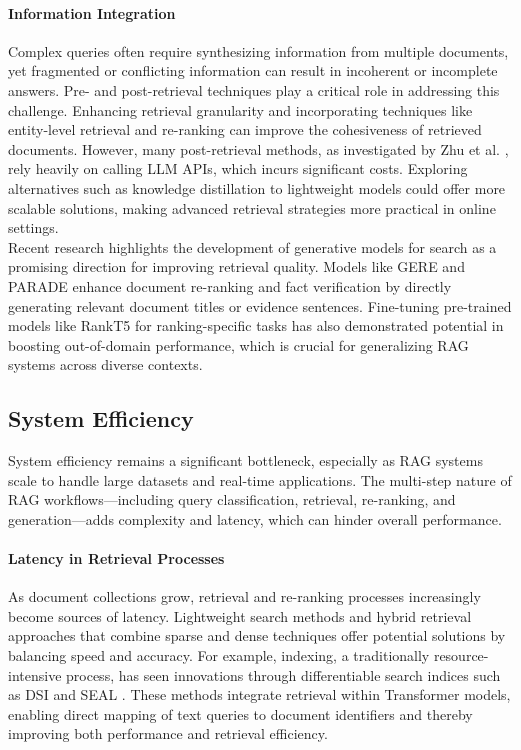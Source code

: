 \paragraph{Information Integration}
Complex queries often require synthesizing information from multiple documents, yet fragmented or conflicting information can result in incoherent or incomplete answers. Pre- and post-retrieval techniques play a critical role in addressing this challenge. Enhancing retrieval granularity and incorporating techniques like entity-level retrieval and re-ranking can improve the cohesiveness of retrieved documents. However, many post-retrieval methods, as investigated by Zhu et al. \cite{zhu2023large}, rely heavily on calling LLM APIs, which incurs significant costs. Exploring alternatives such as knowledge distillation to lightweight models could offer more scalable solutions, making advanced retrieval strategies more practical in online settings. \\

Recent research highlights the development of generative models for search as a promising direction for improving retrieval quality. Models like GERE \cite{chen2022gere} and PARADE \cite{li2024parade} enhance document re-ranking and fact verification by directly generating relevant document titles or evidence sentences. Fine-tuning pre-trained models like RankT5 \cite{zhuang2023rankt} for ranking-specific tasks has also demonstrated potential in boosting out-of-domain performance, which is crucial for generalizing RAG systems across diverse contexts.

\subsection{System Efficiency}

System efficiency remains a significant bottleneck, especially as RAG systems scale to handle large datasets and real-time applications. The multi-step nature of RAG workflows—including query classification, retrieval, re-ranking, and generation—adds complexity and latency, which can hinder overall performance.

\paragraph{Latency in Retrieval Processes}
As document collections grow, retrieval and re-ranking processes increasingly become sources of latency. Lightweight search methods and hybrid retrieval approaches that combine sparse and dense techniques offer potential solutions by balancing speed and accuracy. For example, indexing, a traditionally resource-intensive process, has seen innovations through differentiable search indices such as DSI \cite{tay2022transformer} and SEAL \cite{bevilacqua2022autoregressive}. These methods integrate retrieval within Transformer models, enabling direct mapping of text queries to document identifiers and thereby improving both performance and retrieval efficiency.

